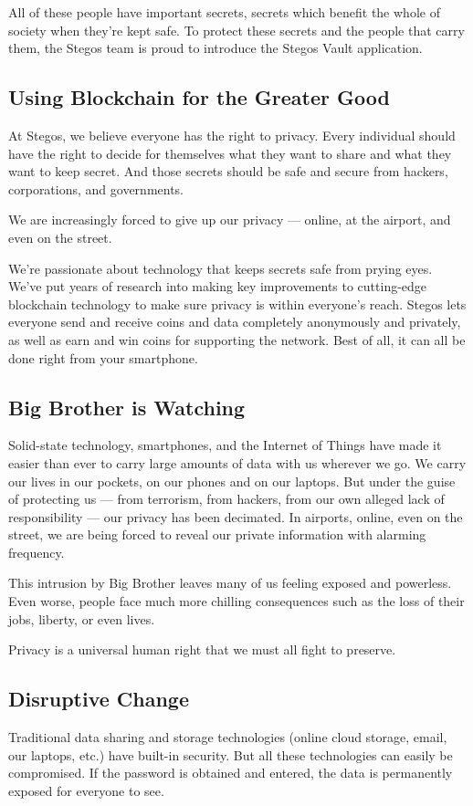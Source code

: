 \documentclass[a4paper, 10pt, conference]{ieeeconf}
\begin{document}
All of these people have important secrets, secrets which benefit the whole of society when they’re kept safe. To protect these secrets and the people that carry them, the Stegos team is proud to introduce the Stegos Vault application.

\subsection{Using Blockchain for the Greater Good}
At Stegos, we believe everyone has the right to privacy. Every individual should have the right to decide for themselves what they want to share and what they want to keep secret. And those secrets should be safe and secure from hackers, corporations, and governments.

We are increasingly forced to give up our privacy — online, at the airport, and even on the street. 

We're passionate about technology that keeps secrets safe from prying eyes. We’ve put years of research into making key improvements to cutting-edge blockchain technology to make sure privacy is within everyone’s reach. Stegos lets everyone send and receive coins and data completely anonymously and privately, as well as earn and win coins for supporting the network. Best of all, it can all be done right from your smartphone.

\subsection{Big Brother is Watching}
Solid-state technology, smartphones, and the Internet of Things have made it easier than ever to carry large amounts of data with us wherever we go. We carry our lives in our pockets, on our phones and on our laptops. But under the guise of protecting us — from terrorism, from hackers, from our own alleged lack of responsibility — our privacy has been decimated. In airports, online, even on the street, we are being forced to reveal our private information with alarming frequency.

This intrusion by Big Brother leaves many of us feeling exposed and powerless. Even worse, people face much more chilling consequences such as the loss of their jobs, liberty, or even lives.

Privacy is a universal human right that we must all fight to preserve.
  
\subsection{Disruptive Change}
Traditional data sharing and storage technologies (online cloud storage, email, our laptops, etc.) have built-in security. But all these technologies can easily be compromised. If the password is obtained and entered, the data is permanently exposed for everyone to see.
\end{document}
